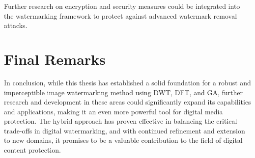 Further research on encryption and security measures could be integrated into the watermarking framework to protect against advanced watermark removal attacks.

\section{Final Remarks}

In conclusion, while this thesis has established a solid foundation for a robust and imperceptible image watermarking method using DWT, DFT, and GA, further research and development in these areas could significantly expand its capabilities and applications, making it an even more powerful tool for digital media protection. The hybrid approach has proven effective in balancing the critical trade-offs in digital watermarking, and with continued refinement and extension to new domains, it promises to be a valuable contribution to the field of digital content protection.
